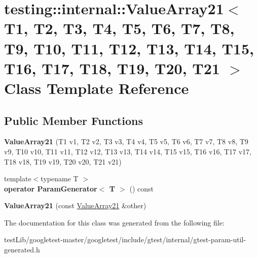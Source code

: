 \hypertarget{classtesting_1_1internal_1_1ValueArray21}{}\section{testing\+:\+:internal\+:\+:Value\+Array21$<$ T1, T2, T3, T4, T5, T6, T7, T8, T9, T10, T11, T12, T13, T14, T15, T16, T17, T18, T19, T20, T21 $>$ Class Template Reference}
\label{classtesting_1_1internal_1_1ValueArray21}
\subsection*{Public Member Functions}
\begin{DoxyCompactItemize}
\item 
\mbox{\label{classtesting_1_1internal_1_1ValueArray21_a111043ab8258ecb243c67c84d1f8e0f4}} 
{\bfseries Value\+Array21} (T1 v1, T2 v2, T3 v3, T4 v4, T5 v5, T6 v6, T7 v7, T8 v8, T9 v9, T10 v10, T11 v11, T12 v12, T13 v13, T14 v14, T15 v15, T16 v16, T17 v17, T18 v18, T19 v19, T20 v20, T21 v21)
\item 
\mbox{\label{classtesting_1_1internal_1_1ValueArray21_aa5b2264c55d6b5315622e2e5c3deeb35}} 
{\footnotesize template$<$typename T $>$ }\\{\bfseries operator Param\+Generator$<$ T $>$} () const
\item 
\mbox{\label{classtesting_1_1internal_1_1ValueArray21_af0804d08ff252ed8f942ac48f90ccef3}} 
{\bfseries Value\+Array21} (const \hyperlink{classtesting_1_1internal_1_1ValueArray21}{Value\+Array21} \&other)
\end{DoxyCompactItemize}


The documentation for this class was generated from the following file\+:\begin{DoxyCompactItemize}
\item 
test\+Lib/googletest-\/master/googletest/include/gtest/internal/gtest-\/param-\/util-\/generated.\+h\end{DoxyCompactItemize}
